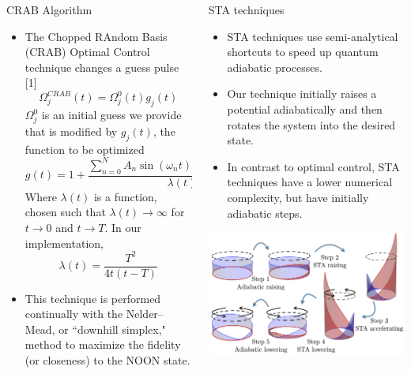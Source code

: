 \documentclass[final]{beamer}
\begin{document}
\begin{frame}
\begin{columns}[t]
\begin{column}{.49\textwidth}
\vfill

\begin{block}{CRAB Algorithm}
  \begin{itemize}
    \item The Chopped RAndom Basis (CRAB) Optimal Control technique changes a guess pulse [1]
    $$\Omega^{CRAB}_j(t) = \Omega^0_j(t)g_j(t)$$
    $\Omega^0_j$ is an initial guess we provide that is modified by $g_j(t)$, the function to be optimized
    $$g(t) = 1 + \frac{\sum^{N}_{n = 0}A_n\sin(\omega_nt)+B_n\cos(\omega_nt)}{\lambda(t)}$$
    Where $\lambda(t)$ is a function, chosen such that $\lambda(t) \rightarrow \infty$ for $t \rightarrow 0$ and $t \rightarrow T$. In our implementation, $$\lambda(t) = \frac{T^2}{4t(t-T)}$$
    \item This technique is performed continually with the Nelder--Mead, or ``downhill simplex," method to maximize the fidelity (or closeness) to the NOON state.
  \end{itemize}

\end{block}
\end{column}


\begin{column}{.49\textwidth}

\begin{block}{STA techniques}
  \begin{itemize}
    \item STA techniques use semi-analytical shortcuts to speed up quantum adiabatic processes.
    \item Our technique initially raises a potential adiabatically and then rotates the system into the desired state.
    \item In contrast to optimal control, STA techniques have a lower numerical complexity, but have initially adiabatic steps.
  \end{itemize}
  \centering
  \includegraphics[width=0.85\linewidth]{STAscheme.png}
\end{block}


\end{column}
\end{columns}
\end{frame}
\end{document}
